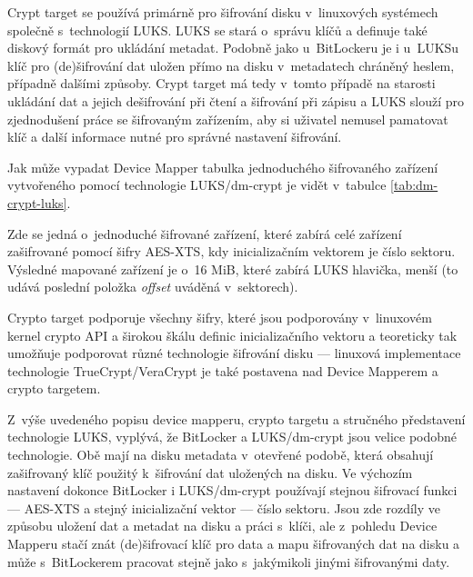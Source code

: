 
Crypt target se používá primárně pro šifrování disku v~linuxových systémech společně s~technologií LUKS. LUKS se stará o~správu klíčů a definuje také diskový formát pro ukládání metadat. Podobně jako u~BitLockeru je i u~LUKSu klíč pro (de)šifrování dat uložen přímo na disku v~metadatech chráněný heslem, případně dalšími způsoby. Crypt target má tedy v~tomto případě na starosti ukládání dat a jejich dešifrování při čtení a šifrování při zápisu a LUKS slouží pro zjednodušení práce se šifrovaným zařízením, aby si uživatel nemusel pamatovat klíč a další informace nutné pro správné nastavení šifrování.\cite{Fruhwirth2005}

Jak může vypadat Device Mapper tabulka jednoduchého šifrovaného zařízení vy\-tvo\-ře\-né\-ho pomocí technologie LUKS/dm-crypt je vidět v~tabulce \ref{tab:dm-crypt-luks}.


Zde se jedná o~jednoduché šifrované zařízení, které zabírá celé zařízení zašifrované pomocí šifry AES-XTS, kdy inicializačním vektorem je číslo sektoru. Výsledné mapované zařízení je o~16 MiB, které zabírá LUKS hlavička, menší (to udává poslední položka \emph{offset} uváděná v~sektorech).

Crypto target podporuje všechny šifry, které jsou podporovány v~linuxovém kernel crypto API a širokou škálu definic inicializačního vektoru a teoreticky tak umožňuje podporovat různé technologie šifrování disku --- linuxová implementace technologie TrueCrypt/VeraCrypt je také postavena nad Device Mapperem a crypto targetem\cite{Broz2014}.


Z~výše uvedeného popisu device mapperu, crypto targetu a stručného představení technologie LUKS, vyplývá, že BitLocker a LUKS/dm-crypt jsou velice podobné technologie. Obě mají na disku metadata v~otevřené podobě, která obsahují zašifrovaný klíč použitý k~šifrování dat uložených na disku. Ve výchozím nastavení dokonce BitLocker i LUKS/dm-crypt používají stejnou šifrovací funkci --- AES-XTS a stejný inicializační vektor --- číslo sektoru. Jsou zde rozdíly ve způsobu uložení dat a metadat na disku a práci s~klíči, ale z~pohledu Device Mapperu stačí znát (de)šifrovací klíč pro data a mapu šifrovaných dat na disku a může s~BitLockerem pracovat stejně jako s~jakýmikoli jinými šifrovanými daty.

